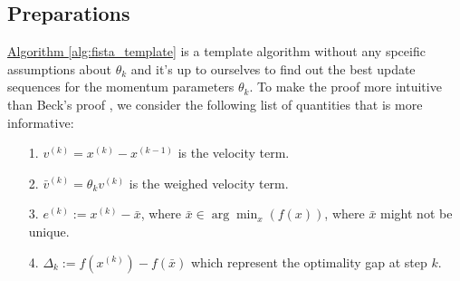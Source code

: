 \documentclass[]{article}
\theoremstyle{definition}
\begin{document}
    \subsection{Preparations}
        \hyperref[alg:fista_template]{Algorithm \ref*{alg:fista_template}} is a template algorithm without any spceific assumptions about $\theta_k$ and it's up to ourselves to find out the best update sequences for the momentum parameters $\theta_k$. To make the proof more intuitive than Beck's proof \cite{paper:FISTA}, we consider the following list of quantities that is more informative: 
        \begin{itemize}
            \item [1.] $v^{(k)} = x^{(k)} - x^{(k -1)}$ is the velocity term. 
            \item [2.] $\bar v^{(k)}= \theta_k v^{(k)}$ is the weighed velocity term. 
            \item [3.] $e^{(k)} := x^{(k)} - \bar x$, where $\bar x \in \arg\min_{x}(f(x))$, where $\bar x$ might not be unique. 
            \item [4.] $\Delta_k := f(x^{(k)}) - f(\bar x)$ which represent the optimality gap at step $k$. 
        \end{itemize}
\end{document}
